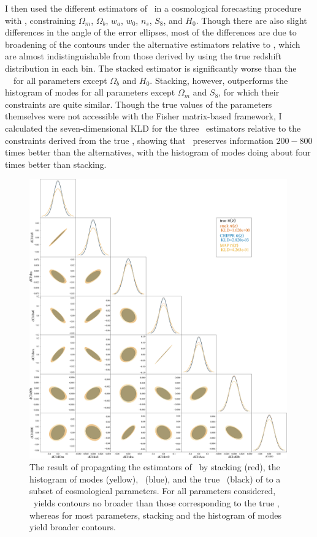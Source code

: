 I then used the different estimators of \nz\ in a cosmological forecasting procedure with \cosmolike, constraining $\Omega_{m}$, $\Omega_{b}$, $w_{a}$, $w_{0}$, $n_{s}$, $S_{8}$, and $H_{0}$.
Though there are also slight differences in the angle of the error ellipses, most of the differences are due to broadening of the contours under the alternative estimators relative to \Chippr, which are almost indistinguishable from those derived by using the true redshift distribution in each bin.
The stacked estimator is significantly worse than the \Chippr\ \mmle\ for all parameters except $\Omega_{b}$ and $H_{0}$.
Stacking, however, outperforms the histogram of modes for all parameters except $\Omega_{m}$ and $S_{8}$, for which their constraints are quite similar.
Though the true values of the parameters themselves were not accessible with the Fisher matrix-based framework, I calculated the seven-dimensional KLD for the three \nz\ estimators relative to the constraints derived from the true \nz, showing that \Chippr\ preserves information $200-800$ times better than the alternatives, with the histogram of modes doing about four times better than stacking.

\begin{figure}
	\begin{center}
		\includegraphics[width=0.99\textwidth]{figures/chippr/final_plot.png}
		\caption{
			The result of propagating the estimators of \nz\ by stacking (red), the histogram of modes (yellow), \Chippr\ (blue), and the true \nz\ (black) of  to a subset of cosmological parameters.
			For all parameters considered, \Chippr\ yields contours no broader than those corresponding to the true \nz, whereas for most parameters, stacking and the histogram of modes yield broader contours.
		}
	\end{center}
\end{figure}

